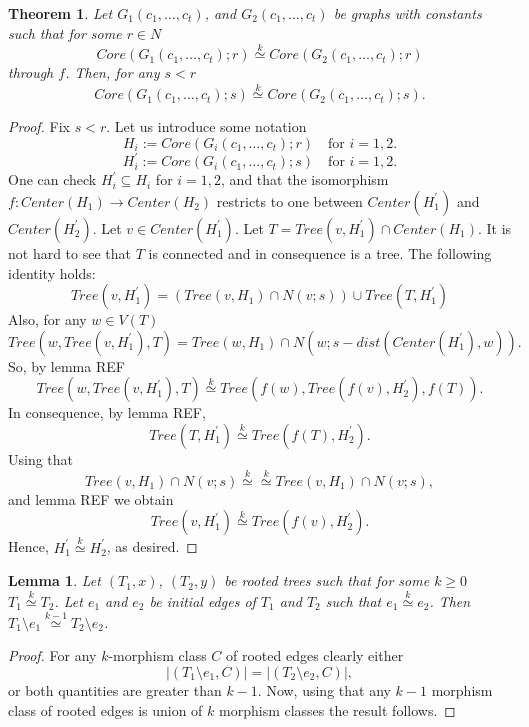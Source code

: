 \documentclass[11pt,notitlepage]{report}
\newtheorem{theorem}{Theorem}[chapter]
\newtheorem{lemma}{Lemma}[chapter]
\theoremstyle{definition}
\theoremstyle{remark}
\newcommand{\morph}[1]{\stackrel{#1}{\simeq}}
\begin{document}
\begin{theorem}
	Let $G_1(c_1,\dots, c_t)$, and $G_2(c_1,\dots,c_t)$ be graphs
	with constants such that for some $r\in N$
	\[ Core(G_1(c_1,\dots, c_t);r)\morph{k} Core(G_2(c_1,\dots,c_t);r)\]
	through $f$. 
	Then, for any $s<r$
	\[ Core(G_1(c_1,\dots, c_t);s)\morph{k} Core(G_2(c_1,\dots,c_t);s).\]
\end{theorem}
\begin{proof}
	Fix $s<r$. Let us introduce some notation
	\[ H_i:= Core(G_i(c_1,\dots, c_t);r) \quad \text{for }i=1,2.\]
	\[ H^\prime_i:= Core(G_i(c_1,\dots, c_t);s) \quad \text{for }i=1,2.\]
	One can check $H^\prime_i\subseteq H_i$ for $i=1,2$, and that the isomorphism 
	$f:Center(H_1)\rightarrow Center(H_2)$ restricts to one between
	$Center(H^\prime_1)$ and $Center(H^\prime_2)$. Let $v\in Center(H^\prime_1)$.
	Let $T=Tree(v,H^\prime_1)\cap Center(H_1)$. It is not hard to see that $T$ is connected 
	and in consequence is a tree. The following identity holds:
	\[ Tree(v,H^\prime_1)= (Tree(v,H_1)\cap N(v;s)) \cup Tree(T,H^\prime_1) \]
	Also, for any $w\in V(T)$
	\[Tree(w,Tree(v,H^\prime_1),T) = Tree(w,H_1)\cap N(w; s-dist(Center(H^\prime_1),w)).\]
	So, by lemma REF 
	\[Tree(w,Tree(v,H^\prime_1),T)\morph{k}Tree(f(w),Tree(f(v),H^\prime_2),f(T)).\]
	In consequence, by lemma REF,
	\[Tree(T,H^\prime_1)\morph{k} Tree(f(T),H^\prime_2).\]
	Using that 
	\[Tree(v,H_1)\cap N(v;s)\morph{k} \morph{k} Tree(v,H_1)\cap N(v;s),\]
	and lemma REF we obtain
	\[Tree(v,H^\prime_1)\morph{k} Tree(f(v),H^\prime_2) .\]
	Hence, $H^\prime_1\morph{k} H^\prime_2$, as desired. 
\end{proof}

\begin{lemma}
	Let $(T_1,x)$, $(T_2, y)$ be rooted trees such that for some $k\geq 0$
	$T_1\morph{k} T_2$. Let $e_1$ and $e_2$ be initial edges of $T_1$ and $T_2$
	such that $e_1\morph{k} e_2$. Then $T_1\setminus e_1\morph{k-1} T_2\setminus e_2$.
\end{lemma}

\begin{proof}
	For any $k$-morphism class $C$ of rooted edges clearly either
	\[|(T_1\setminus e_1,C)|=|(T_2\setminus e_2,C)|,\]
	or both quantities are greater than $k-1$.
	Now, using that any $k-1$ morphism class of rooted edges is union of
	$k$ morphism classes the result follows. 	
\end{proof}
\end{document}
